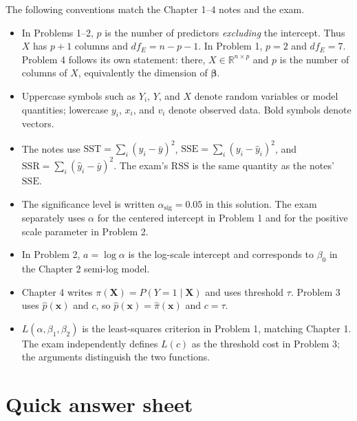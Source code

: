 \documentclass[11pt]{article}
\begin{document}
The following conventions match the Chapter 1--4 notes and the exam.
\begin{itemize}
\item In Problems 1--2, \(p\) is the number of predictors \emph{excluding}
  the intercept. Thus \(X\) has \(p+1\) columns and
  \(df_E=n-p-1\). In Problem 1, \(p=2\) and \(df_E=7\).
  Problem 4 follows its own statement: there, \(X\in\mathbb R^{n\times p}\)
  and \(p\) is the number of columns of \(X\), equivalently the dimension of
  \(\bm\beta\).
\item Uppercase symbols such as \(Y_i\), \(Y\), and \(X\) denote random
  variables or model quantities; lowercase \(y_i\), \(x_i\), and \(v_i\)
  denote observed data. Bold symbols denote vectors.
\item The notes use
  \(\mathrm{SST}=\sum_i(y_i-\bar y)^2\),
  \(\mathrm{SSE}=\sum_i(y_i-\hat y_i)^2\), and
  \(\mathrm{SSR}=\sum_i(\hat y_i-\bar y)^2\).
  The exam's \(\mathrm{RSS}\) is the same quantity as the notes'
  \(\mathrm{SSE}\).
\item The significance level is written \(\alpha_{\mathrm{sig}}=0.05\) in
  this solution. The exam separately uses \(\alpha\) for the centered
  intercept in Problem 1 and for the positive scale parameter in Problem 2.
\item In Problem 2, \(a=\log\alpha\) is the log-scale intercept and
  corresponds to \(\beta_0\) in the Chapter 2 semi-log model.
\item Chapter 4 writes \(\pi(\bm X)=P(Y=1\mid\bm X)\) and uses threshold
  \(\tau\). Problem 3 uses \(\hat p(\bm x)\) and \(c\), so
  \(\hat p(\bm x)=\hat\pi(\bm x)\) and \(c=\tau\).
\item \(L(\alpha,\beta_1,\beta_2)\) is the least-squares criterion in Problem 1,
  matching Chapter 1. The exam independently defines \(L(c)\) as the
  threshold cost in Problem 3; the arguments distinguish the two functions.
\end{itemize}

\clearpage
\section*{Quick answer sheet}
\end{document}
